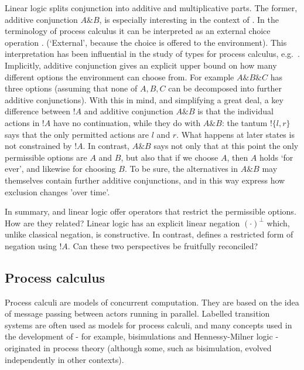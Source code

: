 Linear logic splits conjunction into additive and multiplicative
parts. The former, additive conjunction $A \& B$, is especially
interesting in the context of \cathoristic{}. In the terminology of
process calculus it can be interpreted as an external choice operation
\cite{AbramskyS:comintoll}. (`External', because the choice is offered to
the environment).  This interpretation has been influential in the
study of types for process calculus,
e.g.~\cite{HondaK:unitypsfsifLONG,TakeuchiK:intbaslaits,HondaK:lanpriatdfscbp}.
Implicitly, additive conjunction gives an explicit upper bound on how
many different options the environment can choose from. For example 
$A \& B \& C$ has  three options (assuming that none of $A, B, C$
can be decomposed into further additive conjunctions).  With this in
mind, and simplifying a great deal, a key difference between $!A$ and
additive conjunction $A \& B$ is that the individual actions in $!A$
have no continuation, while they do with $A \& B$: the tantum $!\{l, r\}$ says
that the only permitted  actions are $l$ and $r$. What
happens at later states is not constrained by $!A$.  In contrast, $A \&
B$ says not only that at this point the only permissible options are $A$
and $B$, but also that if we choose $A$, then $A$ holds `for ever',
and likewise for choosing $B$. To be sure, the alternatives in $A \&
B$ may themselves contain further additive conjunctions, and in this
way express how exclusion changes 'over time'.

In summary, \cathoristic{} and linear logic offer  operators that restrict
the permissible options. How are they related? Linear logic has an
explicit linear negation $(\cdot)^{\bot}$ which, unlike classical
negation, is constructive. In contrast, \cathoristic{} defines a restricted
form of negation using $!A$. Can these two perspectives be fruitfully
reconciled?

\subsection{Process calculus}

Process calculi are models of concurrent computation.  They are based
on the idea of message passing between actors running in parallel.
Labelled transition systems are often used as models for process
calculi, and many concepts used in the development of \cathoristic{} -
for example, bisimulations and Hennessy-Milner logic - originated in
process theory (although some, such as bisimulation, evolved
independently in other contexts).

